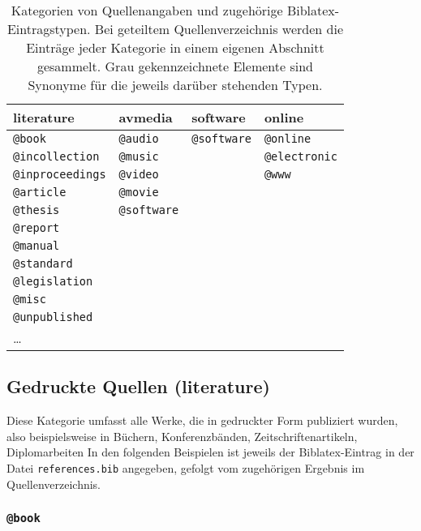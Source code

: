 \begin{table}
\caption{Kategorien von Quellenangaben und zugehörige Biblatex-Eintragstypen. Bei geteiltem Quellenverzeichnis
werden die Einträge jeder Kategorie in einem eigenen Abschnitt gesammelt. Grau gekennzeichnete Elemente sind
Synonyme für die jeweils darüber stehenden Typen.}
\label{tab:BibKategorien}
\centering
{}
\setlength{\tabcolsep}{4mm}
\begin{tabular}{@{}llll@{}}
	\toprule
	\textsf{literature} & \textsf{avmedia} & \textsf{software} & \textsf{online} \\
	\midrule
	\texttt{@book} & \texttt{@audio} & \texttt{@software} & \texttt{@online} \\
	\texttt{@incollection} & \texttt{\color{midgray}@music} & & \texttt{\color{midgray}@electronic} \\
	\texttt{@inproceedings} & \texttt{@video} & & \texttt{\color{midgray}@www} \\
	\texttt{@article} & \texttt{@movie} & & \\
	\texttt{@thesis} & \texttt{@software} & & \\
	\texttt{@report} & & & \\
	\texttt{@manual} & & & \\
	\texttt{@standard} & & & \\
	\texttt{@legislation} & & & \\
	\texttt{@misc} & & &  \\
	\texttt{@unpublished} &  & & \\
	\ldots & & & \\
	\bottomrule
\end{tabular}
\end{table}



\subsection{Gedruckte Quellen (\textsf{literature})}
\label{sec:KategorieLiterature}

Diese Kategorie umfasst alle Werke, die in gedruckter Form publiziert wurden, also beispielsweise in Büchern,
Konferenzbänden, Zeitschriftenartikeln, Diplomarbeiten \usw In den folgenden Beispielen ist jeweils der
Biblatex-Eintrag in der Datei \nolinkurl{references.bib} angegeben, gefolgt vom zugehörigen Ergebnis im
Quellenverzeichnis.


\subsubsection{\texttt{\bfseries @book}}
\label{sec:@book}

